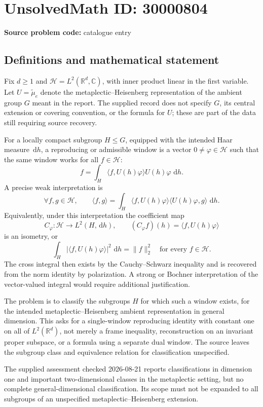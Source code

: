 \documentclass[11pt]{article}
\newcommand{\R}{\mathbb{R}}
\newcommand{\C}{\mathbb{C}}
\newcommand{\dd}{\,\mathrm{d}}
\begin{document}
\section*{UnsolvedMath ID: 30000804}
\textbf{Source problem code:} catalogue entry
\subsection{Definitions and mathematical statement}
Fix \(d\geq1\) and \(\mathcal H=L^2(\R^d,\C)\), with inner product linear in the first variable. Let \(U=\widetilde\mu_e\) denote the metaplectic--Heisenberg representation of the ambient group \(G\) meant in the report. The supplied record does not specify \(G\), its central extension or covering convention, or the formula for \(U\); these are part of the data still requiring source recovery.

For a locally compact subgroup \(H\leq G\), equipped with the intended Haar measure \(\dd h\), a reproducing or admissible window is a vector \(0\ne\varphi\in\mathcal H\) such that the same window works for all \(f\in\mathcal H\):
\[
 f=\int_H\langle f,U(h)\varphi\rangle U(h)\varphi\,\dd h.
\]
A precise weak interpretation is
\[
 \forall f,g\in\mathcal H,\qquad
 \langle f,g\rangle
 =\int_H\langle f,U(h)\varphi\rangle
              \langle U(h)\varphi,g\rangle\,\dd h.
\]
Equivalently, under this interpretation the coefficient map
\[
 C_\varphi:\mathcal H\longrightarrow L^2(H,\dd h),\qquad
 (C_\varphi f)(h)=\langle f,U(h)\varphi\rangle
\]
is an isometry, or
\[
 \int_H|\langle f,U(h)\varphi\rangle|^2\,\dd h=\|f\|_2^2
 \quad\text{for every }f\in\mathcal H.
\]
The cross integral then exists by the Cauchy--Schwarz inequality and is recovered from the norm identity by polarization. A strong or Bochner interpretation of the vector-valued integral would require additional justification.

The problem is to classify the subgroups \(H\) for which such a window exists, for the intended metaplectic--Heisenberg ambient representation in general dimension. This asks for a single-window reproducing identity with constant one on all of \(L^2(\R^d)\), not merely a frame inequality, reconstruction on an invariant proper subspace, or a formula using a separate dual window. The source leaves the subgroup class and equivalence relation for classification unspecified.

The supplied assessment checked 2026-08-21 reports classifications in dimension one and important two-dimensional classes in the metaplectic setting, but no complete general-dimensional classification. Its scope must not be expanded to all subgroups of an unspecified metaplectic--Heisenberg extension.
\end{document}
